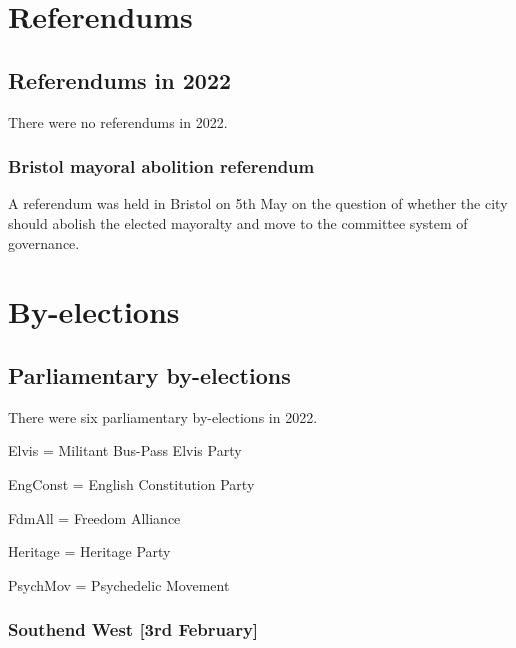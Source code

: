 \documentclass[a4paper,openany]{book}
\begin{document}



\part{Referendums}

\chapter{Referendums in 2022}

There were no referendums in 2022.

\section{Bristol mayoral abolition referendum}

A referendum was held in Bristol on 5th May on the question of whether the city should abolish the elected mayoralty and move to the committee system of governance.


\part{By-elections}

\chapter{Parliamentary by-elections}

There were six parliamentary by-elections in 2022.

%
%
Elvis = Militant Bus-Pass Elvis Party

EngConst = English Constitution Party

FdmAll = Freedom Alliance

Heritage = Heritage Party

PsychMov = Psychedelic Movement
%
%
%
%

\section*{Southend West \hspace*{\fill}\nolinebreak[1]%
	\enspace\hspace*{\fill}
	[3rd February]}
\end{document}
